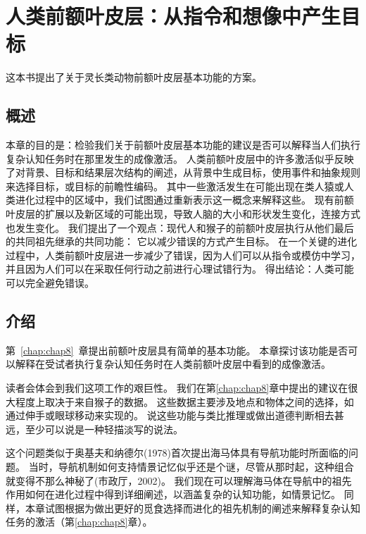 \chapter{人类前额叶皮层：从指令和想像中产生目标} \label{chap:chap9}

这本书提出了关于灵长类动物前额叶皮层基本功能的方案。


\section{概述}

本章的目的是：检验我们关于前额叶皮层基本功能的建议是否可以解释当人们执行复杂认知任务时在那里发生的成像激活。
人类前额叶皮层中的许多激活似乎反映了对背景、目标和结果层次结构的阐述，从背景中生成目标，使用事件和抽象规则来选择目标，或目标的前瞻性编码。
其中一些激活发生在可能出现在类人猿或人类进化过程中的区域中，我们试图通过重新表示这一概念来解释这些。
现有前额叶皮层的扩展以及新区域的可能出现，导致人脑的大小和形状发生变化，连接方式也发生变化。
我们提出了一个观点：现代人和猴子的前额叶皮层执行从他们最后的共同祖先继承的共同功能：
它以减少错误的方式产生目标。
在一个关键的进化过程中，人类前额叶皮层进一步减少了错误，因为人们可以从指令或模仿中学习，并且因为人们可以在采取任何行动之前进行心理试错行为。
得出结论：人类可能可以完全避免错误。



\section{介绍}

第~\ref{chap:chap8}~章提出前额叶皮层具有简单的基本功能。
本章探讨该功能是否可以解释在受试者执行复杂认知任务时在人类前额叶皮层中看到的成像激活。
\par


读者会体会到我们这项工作的艰巨性。
我们在第\ref{chap:chap8}章中提出的建议在很大程度上取决于来自猴子的数据。
这些数据主要涉及地点和物体之间的选择，如通过伸手或眼球移动来实现的。
说这些功能与类比推理或做出道德判断相去甚远，至少可以说是一种轻描淡写的说法。
\par


这个问题类似于奥基夫和纳德尔(1978)首次提出海马体具有导航功能时所面临的问题。
当时，导航机制如何支持情景记忆似乎还是个谜，尽管从那时起，这种组合就变得不那么神秘了(市政厅，2002)。
我们现在可以理解海马体在导航中的祖先作用如何在进化过程中得到详细阐述，以涵盖复杂的认知功能，如情景记忆。
同样，本章试图根据为做出更好的觅食选择而进化的祖先机制的阐述来解释复杂认知任务的激活（第\ref{chap:chap8}章）。
\par


